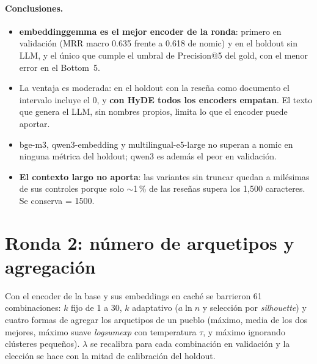 \documentclass[11pt,a4paper]{article}
\newcommand{\cod}[1]{\texttt{\detokenize{#1}}}
\newcommand{\tabla}[1]{\resizebox{\ifdim\width>\linewidth\linewidth\else\width\fi}{!}{}}
\begin{document}
\paragraph{Conclusiones.}
\begin{itemize}
  \item \textbf{embeddinggemma es el mejor encoder de la ronda}: primero en validación (MRR macro
        0.635 frente a 0.618 de nomic) y en el holdout sin LLM, y el único que cumple el umbral de
        Precision@5 del gold, con el menor error en el Bottom~5.
  \item La ventaja es moderada: en el holdout con la reseña como documento el intervalo incluye el
        0, y \textbf{con HyDE todos los encoders empatan}. El texto que genera el LLM, sin nombres
        propios, limita lo que el encoder puede aportar.
  \item bge-m3, qwen3-embedding y multilingual-e5-large no superan a nomic en ninguna métrica del
        holdout; qwen3 es además el peor en validación.
  \item \textbf{El contexto largo no aporta}: las variantes sin truncar quedan a milésimas de sus
        controles porque solo $\sim$1\,\% de las reseñas supera los 1,500 caracteres. Se conserva
        \cod{max_chars} = 1500.
\end{itemize}

\section{Ronda 2: número de arquetipos y agregación}

Con el encoder de la base y sus embeddings en caché se barrieron 61 combinaciones: $k$ fijo de 1
a 30, $k$ adaptativo ($a\ln n$ y selección por \emph{silhouette}) y cuatro formas de agregar los
arquetipos de un pueblo (máximo, media de los dos mejores, máximo suave \emph{logsumexp} con
temperatura $\tau$, y máximo ignorando clústeres pequeños). $\lambda$ se recalibra para cada
combinación en validación y la elección se hace con la mitad de calibración del holdout.

\begin{table}[H]\centering\small
\tabla{arquetipos_k}
\caption{$k$ fijo con máximo y con logsumexp. <<MRR calib.>>: MRR macro en la mitad de calibración
del holdout (reseña como documento, $n=300$).}
\end{table}

\begin{table}[H]\centering\small
\tabla{arquetipos_otras}
\caption{Otras variantes del barrido.}
\end{table}
\end{document}
